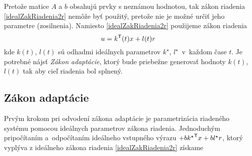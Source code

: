 \documentclass[a4paper, 10pt, ]{article}
\begin{document}
Pretože matice $A$ a $b$ obsahujú prvky s neznámou hodnotou, tak zákon riadenia \eqref{idealZakRiadenia2r} nemôže byť použitý, pretože nie je možné určiť jeho parametre (zosilnenia). Namiesto \eqref{idealZakRiadenia2r} použijeme zákon riadenia
\begin{equation} \label{estZakRiadenia2r}
    u = k^{\mathsf{T}}(t) x + l(t) r
\end{equation}
kde $k(t)$, $l(t)$ sú odhadmi ideálnych parametrov $k^\star$, $l^\star$~v~každom čase $t$. Je potrebné nájsť \emph{Zákon adaptácie}, ktorý bude priebežne generovať hodnoty $k(t)$, $l(t)$ tak aby cieľ riadenia bol splnený.










\subsection{Zákon adaptácie}


Prvým krokom pri odvodení zákona adaptácie je parametrizácia riadeného systému pomocou ideálnych parametrov zákona riadenia. Jednoduchým pripočítaním a~odpočítaním ideálneho vstupného výrazu $+b{k^\star}^{\mathsf{T}} x+bl^\star r$, ktorý vyplýva z ideálneho zákona riadenia \eqref{idealZakRiadenia2r} získame
\end{document}
